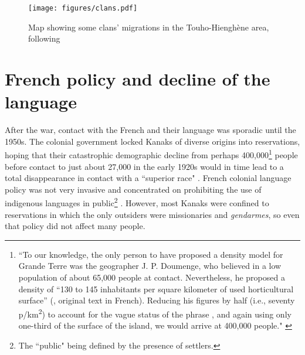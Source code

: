 \begin{figure}[t]
	\texttt{[image: figures/clans.pdf]}
	\caption{Map showing some clans' migrations in the Touho-Hienghène area, following \cite[71]{guiart_clans_1981}}
	\label{map:clan_movements}
\end{figure} 


\section{French policy and decline of the language}
\label{ssec:Frenchpolicy}
After the war, contact with the French and their language was sporadic until the 1950s. The colonial government locked Kanaks of diverse origins into reservations, hoping that their catastrophic demographic decline from perhaps 400,000{\footnote{``To our knowledge, the only person to have proposed a density model for Grande Terre was the geographer J. P. Doumenge, who believed in a low population of about 65,000 people at contact. Nevertheless, he proposed a density of ``130 to 145 inhabitants per square kilometer of used horticultural surface'' (\citealt[463]{doumenge_terroir_1982}, original text in French). Reducing his figures by half (i.e., seventy p/km\textsuperscript{2}) to account for the vague status of the phrase , and again using only one-third of the surface of the island, we would arrive at 400,000 people." \parencite[316]{sand_what_2007}}} people before contact \parencite[316]{sand_what_2007} to just about 27,000 in the early 1920s \parencite[309]{sand_what_2007} would in time lead to a total disappearance in contact with a ``superior race" \parencites[289]{stern_colonies_1943}[2]{salaun_francophonie_2005}. French colonial language policy was not very invasive and concentrated on prohibiting the use of indigenous languages in public\footnote{The ``public" being defined by the presence of settlers.} \parencite[2]{salaun_francophonie_2005}. However, most Kanaks were confined to reservations \parencite[3]{demmer_nationalisme_2003} in which the only outsiders were missionaries and \textit{gendarmes}, so even that policy did not affect many people. %

